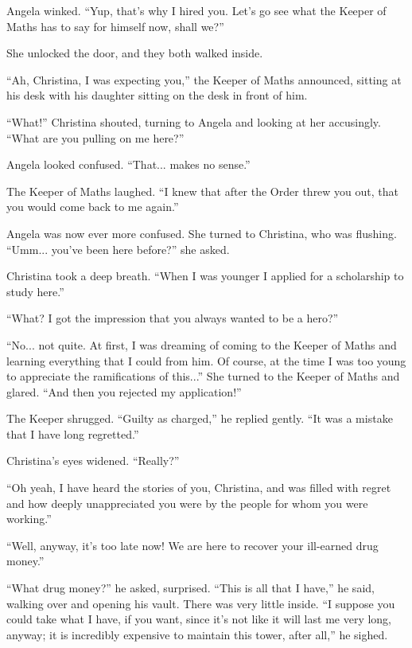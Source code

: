 \documentclass[showtrims,b6paper,draft,10pt]{memoir}
\begin{document}
Angela winked.  ``Yup, that's why I hired you.  Let's go see what the Keeper of Maths has to say for himself now, shall we?''

She unlocked the door, and they both walked inside.

\timeskip
``Ah, Christina, I was expecting you,'' the Keeper of Maths announced, sitting at his desk with his daughter sitting on the desk in front of him.

``What!'' Christina shouted, turning to Angela and looking at her accusingly.  ``What are you pulling on me here?''

Angela looked confused.  ``That... makes no sense.''

The Keeper of Maths laughed.  ``I knew that after the Order threw you out, that you would come back to me again.''

Angela was now ever more confused.  She turned to Christina, who was flushing.  ``Umm... you've been here before?'' she asked.

Christina took a deep breath.  ``When I was younger I applied for a scholarship to study here.''

``What?  I got the impression that you always wanted to be a hero?''

``No... not quite.  At first, I was dreaming of coming to the Keeper of Maths and learning everything that I could from him.  Of course, at the time I was too young to appreciate the ramifications of this...''  She turned to the Keeper of Maths and glared.  ``And then you rejected my application!''

The Keeper shrugged.  ``Guilty as charged,'' he replied gently.  ``It was a mistake that I have long regretted.''

Christina's eyes widened.  ``Really?''

``Oh yeah, I have heard the stories of you, Christina, and was filled with regret and how deeply unappreciated you were by the people for whom you were working.''

``Well, anyway, it's too late now!  We are here to recover your ill-earned drug money.''

``What drug money?'' he asked, surprised.  ``This is all that I have,'' he said, walking over and opening his vault.  There was very little inside.  ``I suppose you could take what I have, if you want, since it's not like it will last me very long, anyway;  it is incredibly expensive to maintain this tower, after all,'' he sighed.
\end{document}
